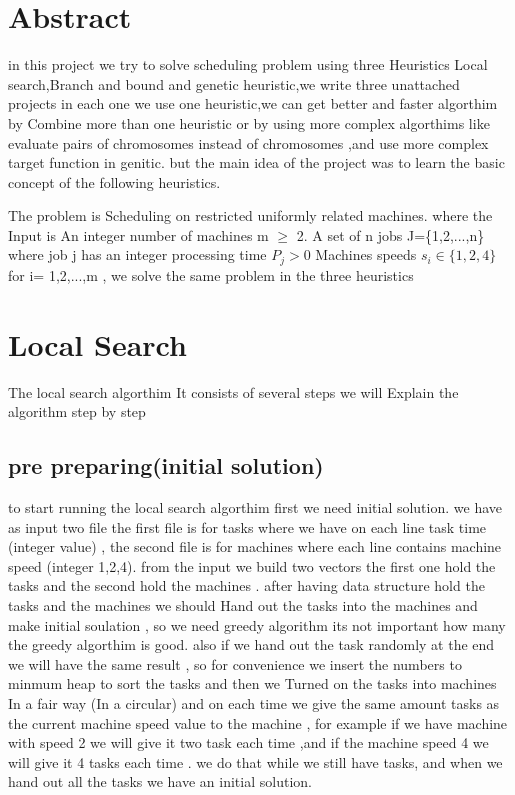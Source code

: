 \documentclass[11pt,fullpage]{article}
\begin{document}
\date{}

\maketitle

\section{Abstract}

in this project we try to solve scheduling problem using three Heuristics Local search,Branch and bound and genetic heuristic,we write three unattached projects in each one we use one heuristic,we can get better  and faster algorthim by Combine more than one heuristic or by using more complex algorthims like evaluate pairs of chromosomes instead of chromosomes ,and use more complex target function in genitic. but the main idea of the project was to learn the basic concept of the following heuristics.\newline

The problem is Scheduling on restricted uniformly related machines. where the Input is An integer number of machines m $\geq$ 2. A set of n jobs J=\{1,2,...,n\} 
where job j has an integer processing time  $P_j > 0$ Machines speeds $s_i \in \{1,2,4\}$  for i= 1,2,...,m , we solve the same problem in the three heuristics
\section{Local Search}
The local search algorthim It consists of several steps we will Explain the algorithm step by step
\subsection{pre preparing(initial solution)}
to start running the local search algorthim  first we need initial solution. we have as input two file the first file is for tasks where we have on each line  task time (integer value) ,  the second file is for machines where each line contains machine speed    (integer 1,2,4). from the input we build two vectors the first one hold the tasks and the second hold the machines . after having data structure hold the tasks and the machines we should Hand out the tasks into  the machines and make initial soulation , so we need  greedy algorithm  its not important how many the greedy algorthim is good. also if we hand out the task randomly at the end we will have the same result ,  so for convenience we insert the numbers to minmum heap  to sort the tasks and then we Turned on the tasks into machines In a fair way (In a circular) and on each time  we give the same amount tasks as the current machine speed value to the machine , for example if we have machine with speed 2 we will give it two task each time ,and if the machine speed 4 we will give it 4 tasks each time . we do that while we still have tasks, and when we hand out all the tasks
we have an initial solution.
\end{document}
